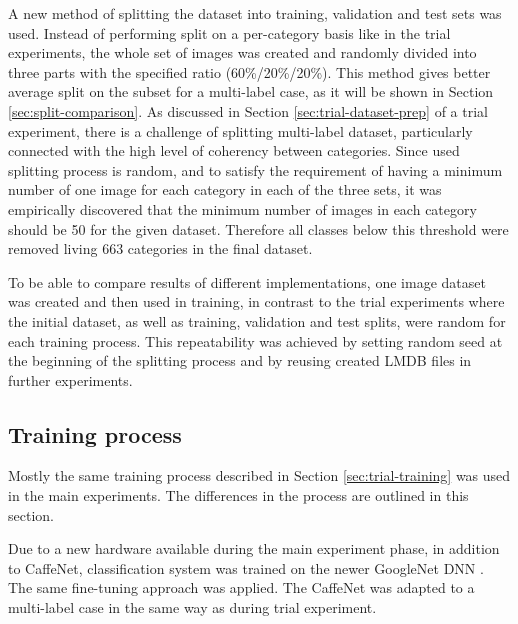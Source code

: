     A new method of splitting the dataset into training, validation and test sets was used. Instead of performing split on a per-category basis like in the trial experiments, the whole set of images was created and randomly divided into three parts with the specified ratio (60\%/20\%/20\%). This method gives better average split on the subset for a multi-label case, as it will be shown in Section \ref{sec:split-comparison}. As discussed in Section \ref{sec:trial-dataset-prep} of a trial experiment, there is a challenge of splitting multi-label dataset, particularly connected with the high level of coherency between categories. Since used splitting process is random, and to satisfy the requirement of having a minimum number of one image for each category in each of the three sets, it was empirically discovered that the minimum number of images in each category should be 50 for the given dataset. Therefore all classes below this threshold were removed living 663 categories in the final dataset.
    
    To be able to compare results of different implementations, one image dataset was created and then used in training, in contrast to the trial experiments where the initial dataset, as well as training, validation and test splits, were random for each training process. This repeatability was achieved by setting random seed at the beginning of the splitting process and by reusing created LMDB files in further experiments.
    
    
    
    \subsection{Training process}
    \label{sec:main-training}
    Mostly the same training process described in Section \ref{sec:trial-training} was used in the main experiments. The differences in the process are outlined in this section. 
    
    Due to a new hardware available during the main experiment phase, in addition to CaffeNet, classification system was trained on the newer GoogleNet DNN \cite{Szegedy2015GoingDeeper}. The same fine-tuning approach was applied. The CaffeNet was adapted to a multi-label case in the same way as during trial experiment.
    
